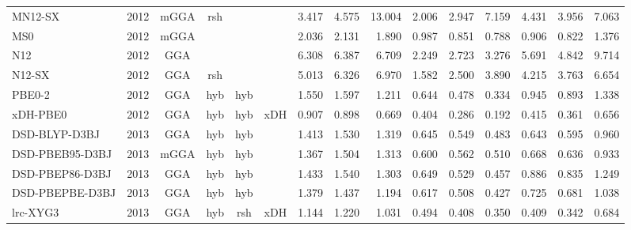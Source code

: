 \begin{landscape}
\begin{longtable}{lc:cccc:rrr:rrr:rrr}
    MN12-SX          & 2012 & mGGA & rsh      &             &           & 3.417             & 4.575             & 13.004 & 2.006              & 2.947             & 7.159  & 4.431   & 3.956 & 7.063 \\
    MS0              & 2012 & mGGA &          &             &           & 2.036             & 2.131             & 1.890  & 0.987              & 0.851             & 0.788  & 0.906   & 0.822 & 1.376 \\
    N12              & 2012 & GGA  &          &             &           & 6.308             & 6.387             & 6.709  & 2.249              & 2.723             & 3.276  & 5.691   & 4.842 & 9.714 \\
    N12-SX           & 2012 & GGA  & rsh      &             &           & 5.013             & 6.326             & 6.970  & 1.582              & 2.500             & 3.890  & 4.215   & 3.763 & 6.654 \\
    PBE0-2           & 2012 & GGA  & hyb      & hyb         &           & 1.550             & 1.597             & 1.211  & 0.644              & 0.478             & 0.334  & 0.945   & 0.893 & 1.338 \\
    xDH-PBE0         & 2012 & GGA  & hyb      & hyb         & xDH       & 0.907             & 0.898             & 0.669  & 0.404              & 0.286             & 0.192  & 0.415   & 0.361 & 0.656 \\
    DSD-BLYP-D3BJ    & 2013 & GGA  & hyb      & hyb         &           & 1.413             & 1.530             & 1.319  & 0.645              & 0.549             & 0.483  & 0.643   & 0.595 & 0.960 \\
    DSD-PBEB95-D3BJ  & 2013 & mGGA & hyb      & hyb         &           & 1.367             & 1.504             & 1.313  & 0.600              & 0.562             & 0.510  & 0.668   & 0.636 & 0.933 \\
    DSD-PBEP86-D3BJ  & 2013 & GGA  & hyb      & hyb         &           & 1.433             & 1.540             & 1.303  & 0.649              & 0.529             & 0.457  & 0.886   & 0.835 & 1.249 \\
    DSD-PBEPBE-D3BJ  & 2013 & GGA  & hyb      & hyb         &           & 1.379             & 1.437             & 1.194  & 0.617              & 0.508             & 0.427  & 0.725   & 0.681 & 1.038 \\
    lrc-XYG3         & 2013 & GGA  & hyb      & rsh         & xDH       & 1.144             & 1.220             & 1.031  & 0.494              & 0.408             & 0.350  & 0.409   & 0.342 & 0.684 \\

\end{longtable}
\end{landscape}
